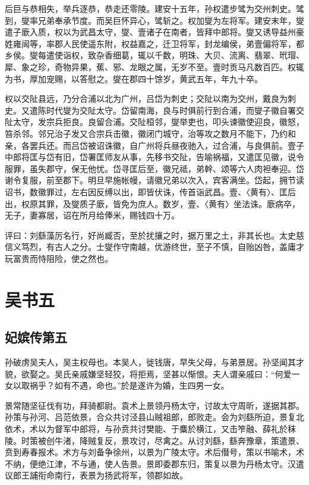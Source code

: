 \documentclass[12pt,UTF8]{ctexbook}
\begin{document}
后巨与恭相失，举兵逐恭，恭走还零陵。建安十五年，孙权遣步骘为交州刺史。骘到，燮率兄弟奉承节度。而吴巨怀异心，骘斩之。权加燮为左将军。建安末年，燮遣子廞入质，权以为武昌太守，燮、壹诸子在南者，皆拜中郎将。燮又诱导益州豪姓雍闿等，率郡人民使遥东附，权益嘉之，迁卫将军，封龙编侯，弟壹偏将军，都乡侯。燮每遣使诣权，致杂香细葛，辄以千数，明珠、大贝、流离、翡翠、玳瑁、犀、象之珍，奇物异果，蕉、邪、龙眼之属，无岁不至。壹时贡马凡数百匹。权辄为书，厚加宠赐，以答慰之。燮在郡四十馀岁，黄武五年，年九十卒。

权以交阯县远，乃分合浦以北为广州，吕岱为刺史；交阯以南为交州，戴良为刺史。又遣陈时代燮为交阯太守。岱留南海，良与时俱前行到合浦，而燮子徽自署交阯太守，发宗兵拒良。良留合浦。交阯桓邻，燮举吏也，叩头谏徽使迎良，徽怒，笞杀邻。邻兄治子发又合宗兵击徽，徽闭门城守，治等攻之数月不能下，乃约和亲，各罢兵还。而吕岱被诏诛徽，自广州将兵昼夜驰入，过合浦，与良俱前。壹子中郎将匡与岱有旧，岱署匡师友从事，先移书交阯，告喻祸福，又遣匡见徽，说令服罪，虽失郡守，保无他忧。岱寻匡后至，徽兄祗，弟幹、颂等六人肉袒奉迎。岱谢令复服，前至郡下。明旦早施帐幔，请徽兄弟以次入，宾客满坐。岱起，拥节读诏书，数徽罪过，左右因反缚以出，即皆伏诛，传首诣武昌。壹、〈黄有〉、匡后出，权原其罪，及燮质子廞，皆免为庶人。数岁，壹、〈黄有〉坐法诛。廞病卒，无子，妻寡居，诏在所月给俸米，赐钱四十万。

评曰：刘繇藻厉名行，好尚臧否，至於扰攘之时，据万里之土，非其长也。太史慈信义笃烈，有古人之分。士燮作守南越，优游终世，至子不慎，自贻凶咎，盖庸才玩富贵而恃阻险，使之然也。

\part{吴书五}
\chapter{妃嫔传第五}

孙破虏吴夫人，吴主权母也。本吴人，徙钱唐，早失父母，与弟景居。孙坚闻其才貌，欲娶之。吴氏亲戚嫌坚轻狡，将拒焉，坚甚以惭恨。夫人谓亲戚曰：“何爱一女以取祸乎？如有不遇，命也。”於是遂许为婚，生四男一女。

景常随坚征伐有功，拜骑都尉。袁术上景领丹杨太守，讨故太守周昕，遂据其郡。孙策与孙河、吕范依景，合众共讨泾县山贼祖郎，郎败走。会为刘繇所迫，景复北依术，术以为督军中郎将，与孙贲共讨樊能、于麋於横江，又击笮融、薛礼於秣陵。时策被创牛渚，降贼复反，景攻讨，尽禽之。从讨刘繇，繇奔豫章，策遣景、贲到寿春报术。术方与刘备争徐州，以景为广陵太守。术后僣号，策以书喻术，术不纳，便绝江津，不与通，使人告景。景即委郡东归，策复以景为丹杨太守。汉遣议郎王誧衔命南行，表景为扬武将军，领郡如故。
\end{document}
